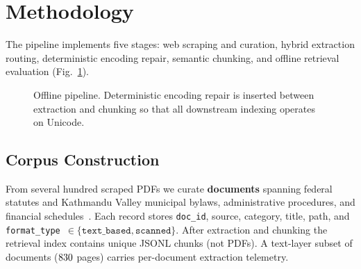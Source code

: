 \documentclass[conference]{IEEEtran}
\begin{document}
\section{Methodology}
The pipeline implements five stages: web scraping and curation, hybrid extraction routing, deterministic encoding repair, semantic chunking, and offline retrieval evaluation (Fig.~\ref{fig:pipeline}).

\begin{figure}[t]
\centering
{}
\caption{Offline pipeline. Deterministic encoding repair is inserted between extraction and chunking so that all downstream indexing operates on Unicode.}
\label{fig:pipeline}
\end{figure}

\subsection{Corpus Construction}
From several hundred scraped PDFs we curate \textbf{\corpusDocs{} documents} spanning federal statutes and Kathmandu Valley municipal bylaws, administrative procedures, and financial schedules~\cite{lgoa2074}. Each record stores \texttt{doc\_id}, source, category, title, path, and \texttt{format\_type}~$\in \{\texttt{text\_based},\texttt{scanned}\}$. After extraction and chunking the retrieval index contains \textbf{\corpusChunks{}} unique JSONL chunks (not \corpusChunks{} PDFs). A text-layer subset of \corpusSummaryDocs{} documents ($830$ pages) carries per-document extraction telemetry.
\end{document}
